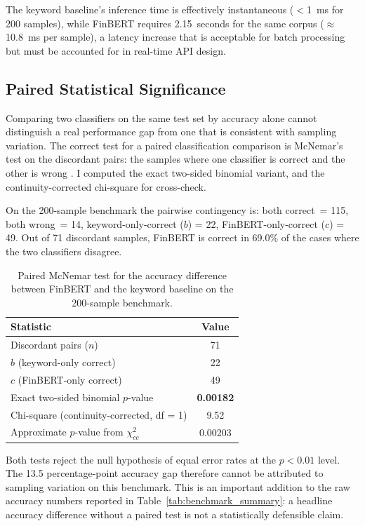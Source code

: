 The keyword baseline's inference time is effectively instantaneous ($<$1~ms for 200 samples), while FinBERT requires 2.15~seconds for the same corpus ($\approx$10.8~ms per sample), a latency increase that is acceptable for batch processing but must be accounted for in real-time API design.

\subsection{Paired Statistical Significance}
\label{sec:mcnemar}

Comparing two classifiers on the same test set by accuracy alone cannot distinguish a real performance gap from one that is consistent with sampling variation. The correct test for a paired classification comparison is McNemar's test on the discordant pairs: the samples where one classifier is correct and the other is wrong \citep{dietterich1998statistical}. I computed the exact two-sided binomial variant, and the continuity-corrected chi-square for cross-check.

On the 200-sample benchmark the pairwise contingency is: both correct~= 115, both wrong~= 14, keyword-only-correct ($b$) = 22, FinBERT-only-correct ($c$) = 49. Out of 71 discordant samples, FinBERT is correct in 69.0\% of the cases where the two classifiers disagree.

\begin{table}[H]
  \centering
  \caption{Paired McNemar test for the accuracy difference between FinBERT and the keyword baseline on the 200-sample benchmark.}
  \label{tab:mcnemar}
  \begin{tabular}{@{}lc@{}}
    \toprule
    \textbf{Statistic} & \textbf{Value} \\
    \midrule
    Discordant pairs ($n$)                         & 71 \\
    $b$ (keyword-only correct)                     & 22 \\
    $c$ (FinBERT-only correct)                     & 49 \\
    Exact two-sided binomial $p$-value             & \textbf{0.00182} \\
    Chi-square (continuity-corrected, df = 1)      & 9.52 \\
    Approximate $p$-value from $\chi^2_{cc}$       & 0.00203 \\
    \bottomrule
  \end{tabular}
\end{table}

Both tests reject the null hypothesis of equal error rates at the $p < 0.01$ level. The 13.5 percentage-point accuracy gap therefore cannot be attributed to sampling variation on this benchmark. This is an important addition to the raw accuracy numbers reported in Table~\ref{tab:benchmark_summary}: a headline accuracy difference without a paired test is not a statistically defensible claim.

